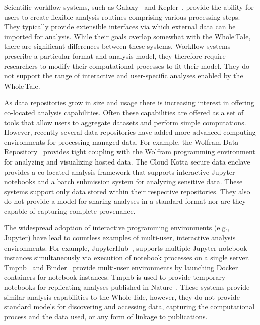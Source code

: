 \documentclass{elsarticle}
\newcommand{\wt}{Whole\,Tale}
\begin{document}
Scientific workflow systems, such as Galaxy~\cite{goecks10galaxy} and 
Kepler~\cite{CPE:CPE994}, provide
the ability for users to create flexible analysis routines 
comprising various processing steps. They typically provide extensible
interfaces via which external data can be imported for analysis. 
While their goals overlap somewhat
with the \wt, there are significant differences between these systems.
Workflow systems prescribe a particular format and analysis model,
they therefore require researchers to modify their computational processes
to fit their model. They do not support the range of interactive 
and user-specific analyses enabled by the \wt.


As data repositories grow in size and usage there is increasing interest
in offering co-located analysis capabilities. 
Often these capabilities are offered as a set of tools
that allow users to aggregate datasets and perform simple computations. 
However, recently several data repositories have added more advanced
computing environments for processing managed data. 
For example, the Wolfram Data Repository~\cite{wolfram} provides tight coupling
with the Wolfram programming environment for analyzing and visualizing hosted data. 
The Cloud Kotta secure data enclave~\cite{babuji16kotta, babuji16secure} 
provides a co-located analysis framework that supports interactive Jupyter 
notebooks and a batch submission system for analyzing sensitive
data. These systems support only data stored within their
respective repositories. They also do not provide a model for sharing analyses 
in a standard format nor are they capable of capturing complete provenance. 

The widespread adoption of interactive programming environments
(e.g., Jupyter) have lead to countless examples of multi-user, interactive analysis environments.
For example, JupyterHub~\cite{jupyterhub}, supports multiple
Jupyter notebook instances simultaneously via execution of
notebook processes on a single server. 
Tmpnb~\cite{tmpnb} and Binder~\cite{binder} provide multi-user environments by launching
Docker containers for notebook instances. Tmpnb is used to provide
temporary notebooks for replicating analyses published 
in Nature~\cite{shen14notebooks}. 
These systems provide similar analysis capabilities to the \wt, 
however, they do not provide 
standard models for discovering and accessing data, capturing 
the computational process and the data used, or any form of linkage to publications.
\end{document}
